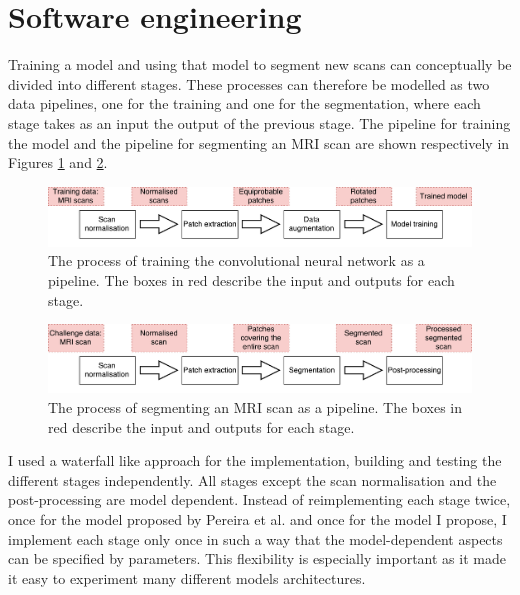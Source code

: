 \documentclass[12pt,a4paper,twoside,openright]{report}
\begin{document}
\section{Software engineering}
Training a model and using that model to segment new scans can conceptually be divided into different stages. These processes can therefore be modelled as two data pipelines, one for the training and one for the segmentation, where each stage takes as an input the output of the previous stage. The pipeline for training the model and the pipeline for segmenting an MRI scan are shown respectively in Figures \ref{fig:training_implementation_pipeline} and \ref{fig:segmentation_implementation_pipeline}.

\begin{figure}
	\centering
	\includegraphics[width=\textwidth]{training_implementation_pipeline}
	\caption[The process of training the convolutional neural network as a pipeline]{The process of training the convolutional neural network as a pipeline. The boxes in red describe the input and outputs for each stage.}
	\label{fig:training_implementation_pipeline}
\end{figure}

\begin{figure}
	\centering
	\includegraphics[width=\textwidth]{segmentation_implementation_pipeline}
	\caption[The process of segmenting an MRI scan as a pipeline]{The process of segmenting an MRI scan as a pipeline. The boxes in red describe the input and outputs for each stage.}
	\label{fig:segmentation_implementation_pipeline}
\end{figure}

I used a waterfall like approach for the implementation, building and testing the different stages independently. All stages except the scan normalisation and the post-processing are model dependent. Instead of reimplementing each stage twice, once for the model proposed by Pereira et al. and once for the model I propose, I implement each stage only once in such a way that the model-dependent aspects can be specified by parameters. This flexibility is especially important as it made it easy to experiment many different models architectures.
\end{document}
